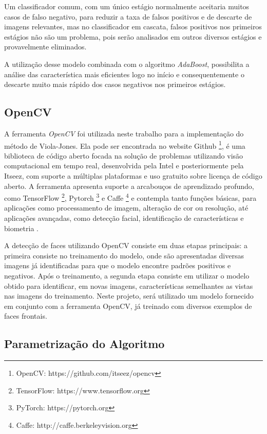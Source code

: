 Um classificador comum, com um único estágio normalmente aceitaria muitos casos de falso negativo, para reduzir a taxa de falsos positivos e de descarte de imagens relevantes, mas no classificador em cascata, falsos positivos nos primeiros estágios não são um problema, pois serão analisados em outros diversos estágios e provavelmente eliminados.

A utilização desse modelo combinada com o algoritmo \textit{AdaBoost}, possibilita a análise das característica mais eficientes logo no início e consequentemente o descarte muito mais rápido dos casos negativos nos primeiros estágios.

\subsection{OpenCV}

A ferramenta \textit{OpenCV} foi utilizada neste trabalho para a implementação do método de Viola-Jones. Ela pode ser encontrada no website Github \footnote{OpenCV: https://github.com/itseez/opencv}, é uma biblioteca de código aberto focada na solução de problemas utilizando visão computacional em tempo real, desenvolvida pela Intel e posteriormente pela Itseez, com suporte a múltiplas plataformas e uso gratuito sobre licença de código aberto. A ferramenta apresenta suporte a arcabouços de aprendizado profundo, como TensorFlow \footnote{TensorFlow: https://www.tensorflow.org}, Pytorch \footnote{PyTorch: https://pytorch.org} e Caffe \footnote{Caffe: http://caffe.berkeleyvision.org} e contempla tanto funções básicas, para aplicações como processamento de imagem, alteração de cor ou resolução, até aplicações avançadas, como detecção facial, identificação de características e biometria \cite{wiki:OpenCV}.

A detecção de faces utilizando OpenCV consiste em duas etapas principais: a primeira consiste no treinamento do modelo, onde são apresentadas diversas imagens já identificadas para que o modelo encontre padrões positivos e negativos. Após o treinamento, a segunda etapa consiste em utilizar o modelo obtido para identificar, em novas imagens, características semelhantes as vistas nas imagens do treinamento. Neste projeto, será utilizado um modelo fornecido em conjunto com a ferramenta OpenCV, já treinado com diversos exemplos de faces frontais.

\subsection{Parametrização do Algoritmo}

